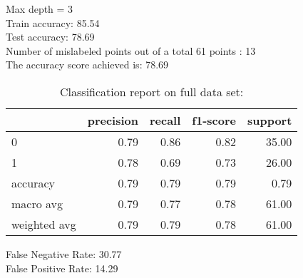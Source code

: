 Max depth = 3\\
Train accuracy: 85.54%
\\Test accuracy: 78.69%
\\Number of mislabeled points out of a total 61 points : 13
\\The accuracy score achieved is: 78.69 %
\begin{table}[H]
\caption{Classification report on full data set:}
\begin{center}
\begin{tabular}{lrrrr}
\toprule
{} &  precision &  recall &  f1-score &  support \\
\midrule
0            &       0.79 &    0.86 &      0.82 &    35.00 \\
1            &       0.78 &    0.69 &      0.73 &    26.00 \\
accuracy     &       0.79 &    0.79 &      0.79 &     0.79 \\
macro avg    &       0.79 &    0.77 &      0.78 &    61.00 \\
weighted avg &       0.79 &    0.79 &      0.78 &    61.00 \\
\bottomrule
\end{tabular}

\label{decision_tree_class}
\end{center}
\end{table}
\noindent
False Negative Rate: 30.77
\\False Positive Rate: 14.29
